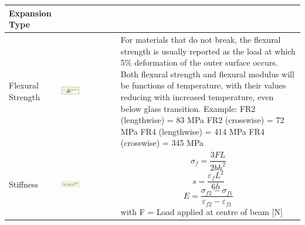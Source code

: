 		
		\begin{table}[h!]
		\centering
		\begin{tabular}{|m{}|m{}|m{}|}
		\hline
			
				\textbf{Expansion Type} & &\\
		\hline
		\hline
				Flexural Strength
			& 
				 \begin{center}\includegraphics[width=0.35\textwidth]{images/FlexuralStrength.png}\end{center}  
			&
				For materials that do not break, the flexural strength is usually reported as the load at which 5\% deformation of the outer surface occurs. Both flexural strength and flexural modulus will be functions of temperature, with their values reducing with increased temperature, even below glass transition. \newline Example: \newline FR2 (lengthwise) = 83 MPa \newline FR2 (crosswise) = 72 MPa \newline FR4 (lengthwise) = 414 MPa \newline FR4 (crosswise) = 345 MPa
			\\
		\hline
				Stiffness
			& 
				 \begin{center}\includegraphics[width=0.35\textwidth]{images/Stiffness.png}\end{center}  
			&
				\begin{equation}
					\sigma_f = \frac{3FL}{2bh^2}
				\end{equation}
				\begin{equation}
					s = \frac{\varepsilon_f L^2}{6h}
				\end{equation}
				\begin{equation}
					E = \frac{\sigma_{f2}-\sigma_{f1}}{\varepsilon_{f2} - \varepsilon_{f1}}
				\end{equation}
				with\newline
				F = Load applied at centre of beam [N]\newline

\end{tabular}
\end{table}

